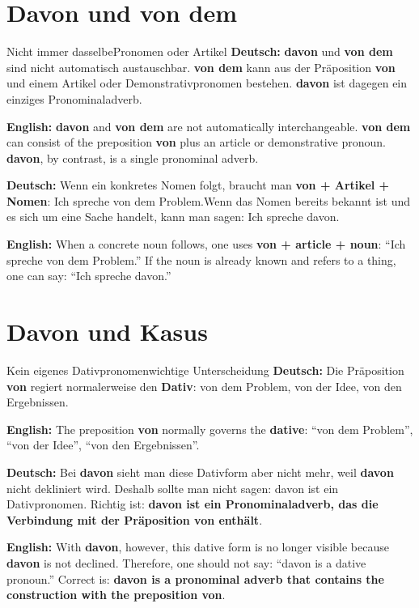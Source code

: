 \documentclass[a4paper,11pt]{article}
\newcommand{\GermanText}[1]{\textbf{Deutsch: }#1\par}
\newcommand{\EnglishText}[1]{{\small\color{SoftGray}\textbf{English: }#1\par}}
\begin{document}
    \section{Davon und \glqq von dem\grqq}

        \begin{grammarentry}{Nicht immer dasselbe}{Pronomen oder Artikel}
            \GermanText{\textbf{davon} und \textbf{von dem} sind nicht automatisch austauschbar. \textbf{von dem} kann aus der Präposition \textbf{von} und einem Artikel oder Demonstrativpronomen bestehen. \textbf{davon} ist dagegen ein einziges Pronominaladverb.}
            \EnglishText{\textbf{davon} and \textbf{von dem} are not automatically interchangeable. \textbf{von dem} can consist of the preposition \textbf{von} plus an article or demonstrative pronoun. \textbf{davon}, by contrast, is a single pronominal adverb.}

            \GermanText{Wenn ein konkretes Nomen folgt, braucht man \textbf{von + Artikel + Nomen}: \glqq Ich spreche von dem Problem.\grqq Wenn das Nomen bereits bekannt ist und es sich um eine Sache handelt, kann man sagen: \glqq Ich spreche davon.\grqq}
            \EnglishText{When a concrete noun follows, one uses \textbf{von + article + noun}: ``Ich spreche von dem Problem.'' If the noun is already known and refers to a thing, one can say: ``Ich spreche davon.''}
        \end{grammarentry}

    \section{Davon und Kasus}

        \begin{grammarentry}{Kein eigenes Dativpronomen}{wichtige Unterscheidung}
            \GermanText{Die Präposition \textbf{von} regiert normalerweise den \textbf{Dativ}: \glqq von dem Problem\grqq, \glqq von der Idee\grqq, \glqq von den Ergebnissen\grqq.}
            \EnglishText{The preposition \textbf{von} normally governs the \textbf{dative}: ``von dem Problem'', ``von der Idee'', ``von den Ergebnissen''.}

            \GermanText{Bei \textbf{davon} sieht man diese Dativform aber nicht mehr, weil \textbf{davon} nicht dekliniert wird. Deshalb sollte man nicht sagen: \glqq davon ist ein Dativpronomen\grqq. Richtig ist: \textbf{davon ist ein Pronominaladverb, das die Verbindung mit der Präposition von enthält}.}
            \EnglishText{With \textbf{davon}, however, this dative form is no longer visible because \textbf{davon} is not declined. Therefore, one should not say: ``davon is a dative pronoun.'' Correct is: \textbf{davon is a pronominal adverb that contains the construction with the preposition von}.}
        \end{grammarentry}
\end{document}
